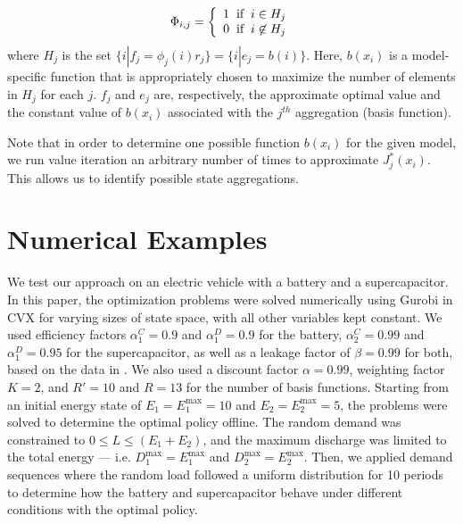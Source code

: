 \documentclass[conference]{IEEEtran}
\begin{document}
    \begin{displaymath}
        \Phi_{i,j}=\left\{
            \begin{array}{l}
            1 \hspace{0.2cm} \text{if} \hspace{0.2cm} i\in H_{j}\\
            0 \hspace{0.2cm} \text{if} \hspace{0.2cm} i\not\in H_{j}
            \end{array}
            \right.
    \end{displaymath}where $H_{j}$ is the set $\{i|f_{j} = \phi_{j}(i)r_{j}\}=\{i|e_{j} = b(i)\}$. Here, $b(x_{i})$ is a model-specific function that is appropriately chosen to maximize the number of elements in $H_{j}$ for each $j$. $f_{j}$ and $e_{j}$ are, respectively, the approximate optimal value and the constant value of $b(x_{i})$ associated with the $j^{th}$ aggregation (basis function).
	
	Note that in order to determine one possible function $b(x_{i})$ for the given model, we run value iteration an arbitrary number of times to approximate $J^{*}_{j}(x_{i})$. This allows us to identify possible state aggregations.
    

\section{Numerical Examples}
We test our approach on an electric vehicle with a battery and a supercapacitor. In this paper, the optimization problems were solved numerically using Gurobi in CVX for varying sizes of state space, with all other variables kept constant. We used efficiency factors $\alpha^{C}_{1}=0.9$ and $\alpha^{D}_{1}=0.9$ for the battery, $\alpha^{C}_{2}=0.99$ and $\alpha^{D}_{1}=0.95$ for the supercapacitor, as well as a leakage factor of $\beta=0.99$ for both, based on the data in \cite{BattSupercapEff}. We also used a discount factor $\alpha=0.99$, weighting factor $K=2$, and $R'=10$ and $R=13$ for the number of basis functions. Starting from an initial energy state of $E_{1}=E_{1}^{\max}=10$ and $E_{2}=E_{2}^{\max}=5$, the problems were solved to determine the optimal policy offline. The random demand was constrained to $0\leq L \leq (E_{1}+E_{2})$, and the maximum discharge was limited to the total energy --- i.e. $D_{1}^{\max}=E_{1}^{\max}$ and $D_{2}^{\max}=E_{2}^{\max}$. Then, we applied demand sequences where the random load followed a uniform distribution for 10 periods to determine how the battery and supercapacitor behave under different conditions with the optimal policy.
\end{document}

